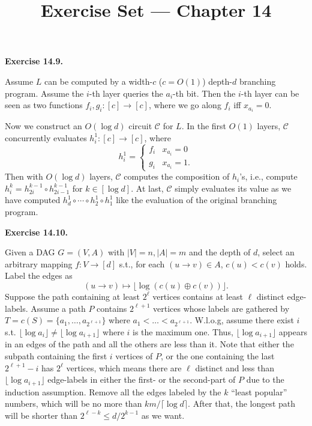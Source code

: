 \documentclass[a4paper]{article}
\title{Exercise Set --- Chapter 14}
\date{}
\newenvironment{exercise}[1]{
	\par
	\noindent\textbf{Exercise #1.}\quad
}{
	\par
	\bigskip
}
\begin{document}
    \maketitle

    \begin{exercise}{14.9}
        Assume $L$ can be computed by a width-$c$ ($c=O(1)$) depth-$d$ branching program. 
        Assume the $i$-th layer queries the $a_i$-th bit. Then the $i$-th layer can be seen as two functions 
        $f_i,g_i:[c]\to[c]$, where we go along $f_i$ iff $x_{a_i}=0$.

        Now we construct an $O(\log d)$ circuit $\mathcal C$ for $L$. In the first $O(1)$ layers, $\mathcal C$ concurrently evaluates
        $h_i^1:[c]\to[c]$, where 
        $$
        h_i^1=\begin{cases}
            f_i&x_{a_i}=0\\
            g_i&x_{a_i}=1.
        \end{cases}
        $$
        Then with $O(\log d)$ layers, $\mathcal C$ computes the composition of $h_i$'s, i.e., compute
        $h_i^k=h_{2i}^{k-1}\circ h_{2i-1}^{k-1}$ for $k\in[\log d]$.
        At last, $\mathcal C$ simply evaluates its value as we have computed $h_d^1\circ\cdots\circ h_2^1\circ h_1^1$ like the evaluation of the original branching program.
    \end{exercise}

    \begin{exercise}{14.10}
        Given a DAG $G = (V, A)$ with $|V| = n, |A| = m$ and the depth of $d$, select an arbitrary mapping $f: V \to [d]$ s.t., for each $(u \to v) \in A$, $c(u) < c(v)$ holds. Label the edges as 
        \[
           (u \to v) \mapsto \lfloor \log(c(u)\oplus c(v))\rfloor.
        \]
        Suppose the path containing at least $2^\ell$ vertices contains at least $\ell$ distinct edge-labels. Assume a path $P$ contains $2^{\ell + 1}$ vertices whose labels are gathered by $T = c(S) = \{a_1, \ldots, a_{2^{\ell + 1}}\}$ where $a_1 < \ldots < a_{2^{\ell + 1}}$. W.l.o.g, assume there exist $i$ s.t. $\lfloor\log a_i\rfloor \neq \lfloor\log a_{i + 1}\rfloor$ where $i$ is the maximum one. Thus, $\lfloor \log a_{i + 1}\rfloor$ appears in an edges of the path and all the others are less than it. Note that either the subpath containing the first $i$ vertices of $P$, or the one containing the last $2^{\ell + 1} - i$ has $2^{\ell}$ vertices, which means there are $\ell$ distinct and less than $\lfloor \log a_{i + 1}\rfloor$ edge-labels in either the first- or the second-part of $P$ due to the induction assumption. Remove all the edges labeled by the $k$ ``least popular'' numbers, which will be no more than $km/\lceil\log d\rceil$. After that, the longest path will be shorter than $2^{\ell - k} \leq d/2^{k - 1}$ as we want.
    \end{exercise}
\end{document}

